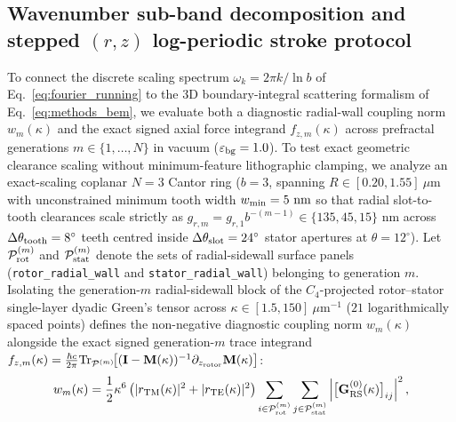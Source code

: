 \documentclass[pdflatex,sn-nature]{sn-jnl}
\begin{document}
\subsection*{Wavenumber sub-band decomposition and stepped $(r,z)$ log-periodic stroke protocol}
To connect the discrete scaling spectrum $\omega_k = 2\pi k / \ln b$ of Eq.~\eqref{eq:fourier_running} to the 3D boundary-integral scattering formalism of Eq.~\eqref{eq:methods_bem}, we evaluate both a diagnostic radial-wall coupling norm $w_m(\kappa)$ and the exact signed axial force integrand $f_{z,m}(\kappa)$ across prefractal generations $m \in \{1, \dots, N\}$ in vacuum ($\varepsilon_{\rm bg}=1.0$). To test exact geometric clearance scaling without minimum-feature lithographic clamping, we analyze an exact-scaling coplanar $N=3$ Cantor ring ($b=3$, spanning $R \in [0.20, 1.55]\ \mu\text{m}$ with unconstrained minimum tooth width $w_{\rm min} = 5\text{ nm}$ so that radial slot-to-tooth clearances scale strictly as $g_{r,m} = g_{r,1} b^{-(m-1)} \in \{135, 45, 15\}\text{ nm}$ across $\Delta\theta_{\rm tooth} = 8^\circ$ teeth centred inside $\Delta\theta_{\rm slot} = 24^\circ$ stator apertures at $\theta = 12^\circ$). Let $\mathcal{P}_{\rm rot}^{(m)}$ and $\mathcal{P}_{\rm stat}^{(m)}$ denote the sets of radial-sidewall surface panels (\texttt{rotor\_radial\_wall} and \texttt{stator\_radial\_wall}) belonging to generation $m$. Isolating the generation-$m$ radial-sidewall block of the $C_4$-projected rotor--stator single-layer dyadic Green's tensor across $\kappa \in [1.5, 150]\ \mu\text{m}^{-1}$ ($21$ logarithmically spaced points) defines the non-negative diagnostic coupling norm $w_m(\kappa)$ alongside the exact signed generation-$m$ trace integrand $f_{z,m}(\kappa) = \frac{\hbar c}{2\pi}\mathrm{Tr}_{\mathcal{P}^{(m)}}\!\bigl[(\mathbf{I}-\mathbf{M}(\kappa))^{-1}\partial_{z_{\rm rotor}}\mathbf{M}(\kappa)\bigr]$:
\begin{equation}
w_m(\kappa) = \frac{1}{2}\kappa^6 \left( |r_{\rm TM}(\kappa)|^2 + |r_{\rm TE}(\kappa)|^2 \right) \sum_{i \in \mathcal{P}_{\rm rot}^{(m)}} \sum_{j \in \mathcal{P}_{\rm stat}^{(m)}} \left| \bigl[\mathbf{G}_{\rm RS}^{(0)}(\kappa)\bigr]_{ij} \right|^2,
\label{eq:methods_spectral_subband}
\end{equation}
\end{document}
